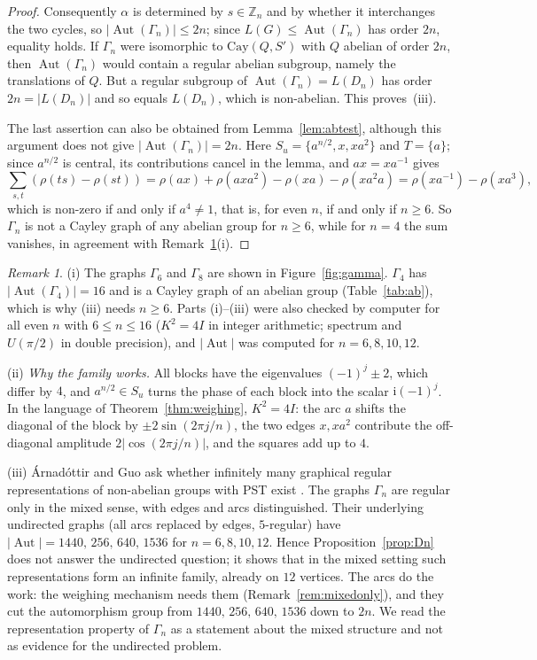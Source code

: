 \documentclass[preprint,11pt]{elsarticle}
\theoremstyle{definition}
\theoremstyle{remark}
\newtheorem{remark}[theorem]{Remark}
\DeclareMathOperator{\Aut}{Aut}
\newcommand{\Z}{\mathbb Z}
\newcommand{\ii}{\mathrm i}
\begin{document}
\begin{proof}
Consequently $\alpha$ is determined by $s\in\Z_n$ and by whether it interchanges the two cycles, so $|\Aut(\Gamma_n)|\le2n$; since $L(G)\le\Aut(\Gamma_n)$ has order $2n$, equality holds. If $\Gamma_n$ were isomorphic to $\mathrm{Cay}(Q,S')$ with $Q$ abelian of order $2n$, then $\Aut(\Gamma_n)$ would contain a regular abelian subgroup, namely the translations of $Q$. But a regular subgroup of $\Aut(\Gamma_n)=L(D_n)$ has order $2n=|L(D_n)|$ and so equals $L(D_n)$, which is non-abelian. This proves~(iii).

The last assertion can also be obtained from Lemma~\ref{lem:abtest}, although this argument does not give $|\Aut(\Gamma_n)|=2n$. Here $S_u=\{a^{n/2},x,xa^2\}$ and $T=\{a\}$; since $a^{n/2}$ is central, its contributions cancel in the lemma, and $ax=xa^{-1}$ gives
\[
\sum_{s,t}(\rho(ts)-\rho(st))=\rho(ax)+\rho(axa^2)-\rho(xa)-\rho(xa^2a)=\rho(xa^{-1})-\rho(xa^{3}),
\]
which is non-zero if and only if $a^{4}\ne1$, that is, for even $n$, if and only if $n\ge6$. So $\Gamma_n$ is not a Cayley graph of any abelian group for $n\ge6$, while for $n=4$ the sum vanishes, in agreement with Remark~\ref{rem:grr-checks}(i).
\end{proof}

\begin{remark}\label{rem:grr-checks}
(i) The graphs $\Gamma_6$ and $\Gamma_8$ are shown in Figure~\ref{fig:gamma}. $\Gamma_4$ has $|\Aut(\Gamma_4)|=16$ and is a Cayley graph of an abelian group (Table~\ref{tab:ab}), which is why (iii) needs $n\ge6$. Parts (i)--(iii) were also checked by computer for all even $n$ with $6\le n\le16$ ($K^2=4I$ in integer arithmetic; spectrum and $U(\pi/2)$ in double precision), and $|\Aut|$ was computed for $n=6,8,10,12$.

(ii) \emph{Why the family works.} All blocks have the eigenvalues $(-1)^j\pm2$, which differ by $4$, and $a^{n/2}\in S_u$ turns the phase of each block into the scalar $\ii(-1)^j$. In the language of Theorem~\ref{thm:weighing}, $K^2=4I$: the arc $a$ shifts the diagonal of the block by $\pm2\sin(2\pi j/n)$, the two edges $x,xa^2$ contribute the off-diagonal amplitude $2|\cos(2\pi j/n)|$, and the squares add up to $4$.

(iii) Árnadóttir and Guo ask whether infinitely many graphical regular representations of non-abelian groups with PST exist \cite[Problem~8.2]{AG}. The graphs $\Gamma_n$ are regular only in the mixed sense, with edges and arcs distinguished. Their underlying undirected graphs (all arcs replaced by edges, $5$-regular) have $|\Aut|=1440,\,256,\,640,\,1536$ for $n=6,8,10,12$. Hence Proposition~\ref{prop:Dn} does not answer the undirected question; it shows that in the mixed setting such representations form an infinite family, already on $12$ vertices. The arcs do the work: the weighing mechanism needs them (Remark~\ref{rem:mixedonly}), and they cut the automorphism group from $1440,\,256,\,640,\,1536$ down to $2n$. We read the representation property of $\Gamma_n$ as a statement about the mixed structure and not as evidence for the undirected problem.
\end{remark}
\end{document}
